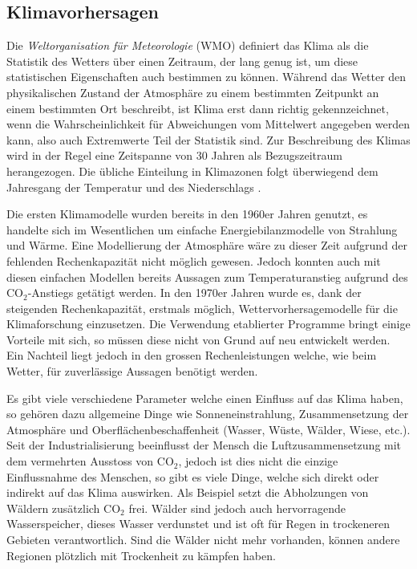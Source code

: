 \begin{refsection}
\subsection{Klimavorhersagen
\label{klima:subsection:entstehung}}
Die {\em Weltorganisation für Meteorologie} (WMO) definiert das Klima als die Statistik des Wetters über einen Zeitraum, der lang genug ist, um diese statistischen Eigenschaften auch bestimmen zu können. Während das Wetter den physikalischen Zustand der Atmosphäre zu einem bestimmten Zeitpunkt an einem bestimmten Ort beschreibt, ist Klima erst dann richtig gekennzeichnet, wenn die Wahrscheinlichkeit für Abweichungen vom Mittelwert angegeben werden kann, also auch Extremwerte Teil der Statistik sind. Zur Beschreibung des Klimas wird in der Regel eine Zeitspanne von 30 Jahren als Bezugszeitraum herangezogen. Die übliche Einteilung in Klimazonen folgt überwiegend dem Jahresgang der Temperatur und des Niederschlags \cite{klima:maxplanck}.

Die ersten Klimamodelle wurden bereits in den 1960er Jahren genutzt, es handelte sich im Wesentlichen um einfache Energiebilanzmodelle von Strahlung und Wärme. Eine Modellierung der Atmosphäre wäre zu dieser Zeit aufgrund der fehlenden Rechenkapazität nicht möglich gewesen. Jedoch konnten auch mit diesen einfachen Modellen bereits Aussagen zum Temperaturanstieg aufgrund des CO$_2$-Anstiegs getätigt werden. In den 1970er Jahren wurde es, dank der steigenden Rechenkapazität, erstmals möglich, Wettervorhersagemodelle für die Klimaforschung einzusetzen. Die Verwendung etablierter Programme bringt einige Vorteile mit sich, so müssen diese nicht von Grund auf neu entwickelt werden. Ein Nachteil liegt jedoch in den grossen Rechenleistungen welche, wie beim Wetter, für zuverlässige Aussagen benötigt werden.
 
Es gibt viele verschiedene Parameter welche einen Einfluss auf das Klima haben, so gehören dazu  allgemeine Dinge wie Sonneneinstrahlung, Zusammensetzung der Atmosphäre und Oberflächenbeschaffenheit (Wasser, Wüste, Wälder, Wiese, etc.). Seit der Industrialisierung beeinflusst der Mensch die Luftzusammensetzung mit dem vermehrten Ausstoss von CO$_2$, jedoch ist dies nicht die einzige Einflussnahme des Menschen, so gibt es viele Dinge, welche sich direkt oder indirekt auf das Klima auswirken. Als Beispiel setzt die Abholzungen von Wäldern zusätzlich CO$_2$ frei. Wälder sind jedoch auch hervorragende Wasserspeicher, dieses Wasser verdunstet und ist oft für Regen in trockeneren Gebieten verantwortlich. Sind die Wälder nicht mehr vorhanden, können andere Regionen plötzlich mit Trockenheit zu kämpfen haben.


\end{refsection}
